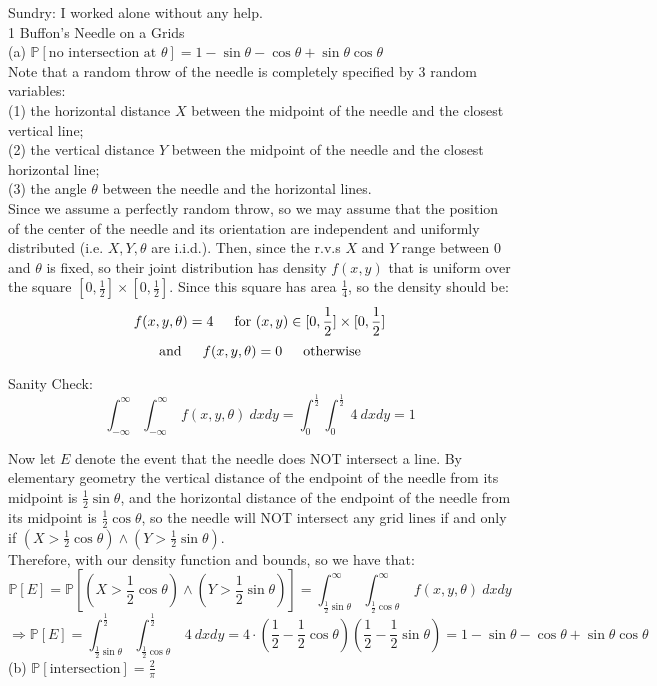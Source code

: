 \documentclass{article}
\begin{document}
Sundry: I worked alone without any help. \\[1cm]
{\Large 1 Buffon’s Needle on a Grids} \\[.5cm]
{\color{red} (a)
$\mathbb{P}[\text{no intersection at } \theta] =
1 - \sin\theta - \cos\theta + \sin\theta\cos\theta$} \\

Note that a random throw of the needle is completely specified by 3 random variables: \\[.1cm]
(1) the horizontal distance $X$ between the midpoint of the needle and the closest vertical line; \\[.1cm]
(2) the vertical distance $Y$ between the midpoint of the needle and the closest horizontal line; \\[.1cm]
(3) the angle $\theta$ between the needle and the horizontal lines. \\

Since we assume a perfectly random throw, so we may assume that the position of the center of the needle and its orientation are independent and uniformly distributed (i.e. $X,Y,\theta$ are i.i.d.).
Then, since the r.v.s $X$ and $Y$ range between 0 and $\theta$ is fixed, so their joint distribution has density $f(x,y)$ that is uniform over the square $[0,\frac{1}{2}] \times [0,\frac{1}{2}]$.
Since this square has area $\frac{1}{4}$, so the density should be:
$$f(x,y,\theta) = 4 \indent \text{for } (x,y)\in [0,\frac{1}{2}] \times [0,\frac{1}{2}]$$
$$\text{and}\indent f(x,y,\theta) = 0 \indent \text{otherwise}$$

Sanity Check:
$$\int_{-\infty}^\infty
	\int_{-\infty}^\infty\ f(x,y,\theta)\ dxdy =
\int_{0}^\frac{1}{2}
	\int_{0}^\frac{1}{2}\ 4\ dxdy = 1
$$

Now let $E$ denote the event that the needle does NOT intersect a line. By elementary geometry the vertical distance of the endpoint of the needle from its midpoint is $\frac{1}{2}\sin\theta$, and the horizontal distance of the endpoint of the needle from its midpoint is $\frac{1}{2}\cos\theta$, so the needle will NOT intersect any grid lines if and only if $(X > \frac{1}{2}\cos\theta) \land (Y > \frac{1}{2}\sin\theta)$. \\

Therefore, with our density function and bounds, so we have that:
$$\mathbb{P}[E] =
\mathbb{P}[(X > \frac{1}{2}\cos\theta) \land (Y > \frac{1}{2}\sin\theta)] =
\int_{\frac{1}{2}\sin\theta}^\infty
	\int_{\frac{1}{2}\cos\theta}^\infty\
		f(x,y,\theta)\ dxdy$$
$$\Longrightarrow \mathbb{P}[E] =
\int_{\frac{1}{2}\sin\theta}^\frac{1}{2}
	\int_{\frac{1}{2}\cos\theta}^\frac{1}{2}\
		4\ dxdy =
4\cdot
	(\frac{1}{2} - \frac{1}{2}\cos\theta)
		(\frac{1}{2} - \frac{1}{2}\sin\theta) =
1 - \sin\theta - \cos\theta + \sin\theta\cos\theta
$$
{\color{red} (b)
$\mathbb{P}[\text{intersection}] = \frac{2}{\pi}$} \\
\end{document}
